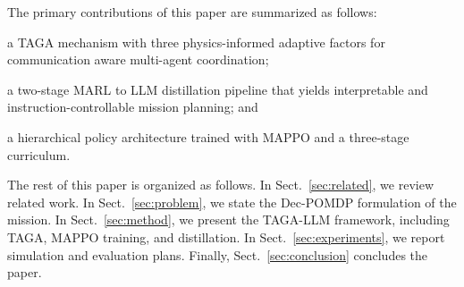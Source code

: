 The primary contributions of this paper are summarized as follows:
\begin{inparaenum}[(a)]
\item a TAGA mechanism with three physics-informed adaptive factors for
  communication aware multi-agent coordination;
\item a two-stage MARL to LLM distillation pipeline that yields
  interpretable and instruction-controllable mission planning; and
\item a hierarchical policy architecture trained with MAPPO and a
  three-stage curriculum.
\end{inparaenum}

The rest of this paper is organized as follows.
In Sect.~\ref{sec:related}, we review related work.
In Sect.~\ref{sec:problem}, we state the Dec-POMDP formulation of the mission.
In Sect.~\ref{sec:method}, we present the TAGA-LLM framework, including TAGA,
MAPPO training, and distillation.
In Sect.~\ref{sec:experiments}, we report simulation and evaluation plans.
Finally, Sect.~\ref{sec:conclusion} concludes the paper.
